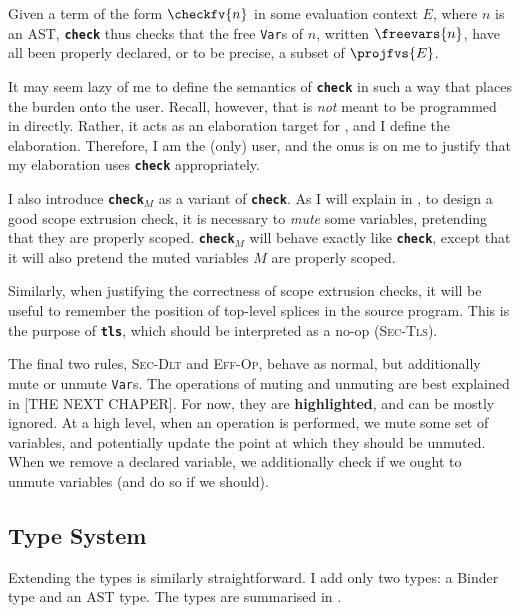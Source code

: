Given a term of the form $\checkfv{n}$ in some evaluation context $E$, where $n$ is an AST, \textbf{\texttt{check}} thus checks that the free \texttt{Var}s of $n$, written $\freevars{n}$, have all been properly declared, or to be precise, a subset of $\projfvs{E}$. 

It may seem lazy of me to define the semantics of \textbf{\texttt{check}} in such a way that places the burden onto the user. Recall, however, that \coreLang{} is \textit{not} meant to be programmed in directly. Rather, it acts as an elaboration target for \sourceLang{}, and I define the elaboration. Therefore, I am the (only) \coreLang{} user, and the onus is on me to justify that my elaboration uses \textbf{\texttt{check}} appropriately. 

I also introduce \textbf{\texttt{check}}$_M$ as a variant of \textbf{\texttt{check}}. As I will explain in , to design a good scope extrusion check, it is necessary to \textit{mute} some variables, pretending that they are properly scoped. \textbf{\texttt{check}}$_M$ will behave exactly like \textbf{\texttt{check}}, except that it will also pretend the muted variables $M$ are properly scoped.

Similarly, when justifying the correctness of scope extrusion checks, it will be useful to remember the position of top-level splices in the \sourceLang{} source program. This is the purpose of \textbf{\texttt{tls}}, which should be interpreted as a no-op (\textsc{Sec-Tls}).

The final two rules, \textsc{Sec-Dlt} and \textsc{Eff-Op}, behave as normal, but additionally mute or unmute \texttt{Var}s. The operations of muting and unmuting are best explained in [THE NEXT CHAPER]. For now, they are \textbf{\textcolor{coreHighlight}{highlighted}}, and can be mostly ignored. At a high level, when an operation is performed, we mute some set of variables, and potentially update the point at which they should be unmuted. When we remove a declared variable, we additionally check if we ought to unmute variables (and do so if we should).

\subsection{Type System}
Extending the types is similarly straightforward. I add only two types: a \textsf{Binder} type and an \textsf{AST} type. The types are summarised in .

